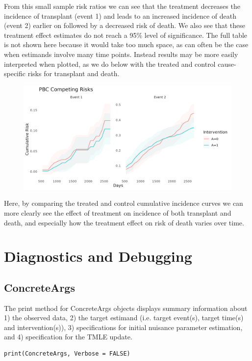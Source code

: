\documentclass{report}
\newcommand{\1}{\ensuremath{\mathbf{1}}}
\begin{document}
From this small sample risk ratios we can see that the treatment decreases the incidence of transplant (event 1) and leads to an increased incidence of death (event 2) earlier on followed by a decreased risk of death. We also see that these treatment effect estimates do not reach a 95\% level of significance. The full table is not shown here because it would take too much space, as can often be the case when estimands involve many time points. Instead results may be more easily interpreted when plotted, as we do below with the treated and control cause-specific risks for transplant and death.

\begin{figure}[H]
\includegraphics[width=\linewidth]{fig/concrete-pbc.png}
\end{figure}

Here, by comparing the treated and control cumulative incidence curves we can more clearly see the effect of treatment on incidence of both transplant and death, and especially how the treatment effect on risk of death varies over time. 

\section{Diagnostics and Debugging}
\label{sec:org023a4af}
\subsection{ConcreteArgs}
\label{sec:org3aaa14e}
The print method for ConcreteArgs objects displays summary information about 1) the observed data, 2) the target estimand (i.e. target event(s), target time(s) and intervention(s)), 3) specifications for initial nuisance parameter estimation, and 4) specification for the TMLE update. 

\begin{lstlisting}
print(ConcreteArgs, Verbose = FALSE)
\end{lstlisting}
\end{document}
